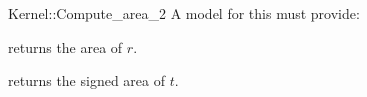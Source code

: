 \begin{ccRefFunctionObjectConcept}{Kernel::Compute_area_2}
A model for this must provide:


       {returns the area of $r$. }

       {returns the signed area of $t$. }

\ccIsModel{}

\end{ccRefFunctionObjectConcept}
